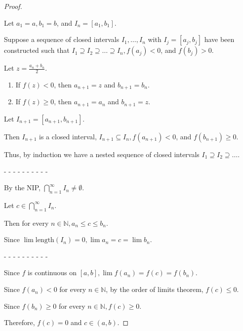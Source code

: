 \documentclass[12pt]{article}
\newcommand{\NN}{\mathbb{N}}
\begin{document}
\begin{proof}
$ $

Let $a_1 = a, b_1 = b$, and $I_n = [a_1, b_1]$.

Suppose a sequence of closed intervals $I_1, \dots, I_n$ with $I_j = [a_j, b_j]$ have been constructed such that $I_1 \supseteq I_2 \supseteq \dots \supseteq I_n, f(a_j) < 0$, and $f(b_j) > 0$.

Let $z = \frac{a_n + b_n}{2}$.

\begin{enumerate}
\item If $f(z) < 0$, then $a_{n + 1} = z$ and $b_{n + 1} = b_n$.

\item If $f(z) \ge 0$, then $a_{n + 1} = a_n$ and $b_{n + 1} = z$.
\end{enumerate}

Let $I_{n + 1} = [a_{n + 1}, b_{n + 1}]$.

Then $I_{n + 1}$ is a closed interval, $I_{n + 1} \subseteq I_n, f(a_{n + 1}) < 0$, and $f(b_{n + 1}) \ge 0$.

Thus, by induction we have a nested sequence of closed intervals $I_1 \supseteq I_2 \supseteq \dots$.

- - - - - - - - - -

By the NIP, $\bigcap_{n = 1}^{\infty} I_n \ne \emptyset$.

Let $c \in \bigcap_{n = 1}^{\infty} I_n$.

Then for every $n \in \NN, a_n \le c \le b_n$.

Since $\lim \text{length}(I_n) = 0, \lim a_n = c = \lim b_n$.

- - - - - - - - - -

Since $f$ is continuous on $[a, b], \lim f(a_n) = f(c) = f(b_n)$.

Since $f(a_n) < 0$ for every $n \in \NN$, by the order of limits theorem, $f(c) \le 0$.

Since $f(b_n) \ge 0$ for every $n \in \NN, f(c) \ge 0$.

Therefore, $f(c) = 0$ and $c \in (a, b)$.
\end{proof}

\pagebreak
\end{document}
